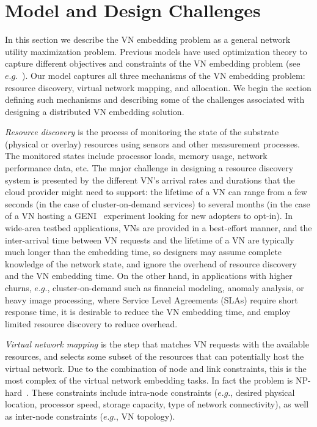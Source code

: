 \documentclass[a4paper, 10pt, conference]{ieeeconf}
\begin{document}
 




\vspace{-1mm}
\section{Model and Design Challenges}\label{sec:model}




In this section we describe the VN embedding problem as a general network utility maximization problem. Previous models have used optimization theory to capture different objectives and constraints of the VN embedding problem (see $e.g.$~\cite{ChowdhuryTON,Houidi2011}). Our model captures all three mechanisms of the VN embedding problem: resource discovery,  virtual network mapping,  and allocation.  We begin the section defining such mechanisms and describing some of the challenges associated with designing a distributed VN embedding solution.  

\emph{Resource discovery} is the process of monitoring the state of the substrate (physical or overlay) resources using sensors and other measurement processes. The monitored states include processor loads, memory usage, network performance data, etc. 
The major challenge in designing a resource discovery system is presented by the different VN's arrival rates and durations that the cloud provider might need to support: the lifetime of a VN can range from a few seconds (in the case of cluster-on-demand services) to several months (in the case of a VN hosting a GENI~\cite{GENI} experiment looking for new adopters to opt-in). 
In wide-area testbed applications, VNs are provided in a best-effort manner, and the inter-arrival time between VN requests and the lifetime of a VN are typically much longer than the embedding time, so designers may assume complete knowledge of the network state, and ignore the overhead of resource discovery and the VN embedding time. On the other hand, in applications with higher churns, $e.g.$, cluster-on-demand such as financial modeling, anomaly analysis, or heavy image processing, where Service Level Agreements (SLAs) require short response time, it is desirable to reduce the VN embedding time, and employ limited resource discovery to reduce overhead. 



{\it Virtual network mapping} is the step that matches VN requests with the available resources, and selects some subset of the resources that can potentially host the virtual network. 
Due to the combination of node and link constraints, this is the most complex of the virtual network embedding tasks. In fact the problem is NP-hard~\cite{mappingNPhard}. These constraints include intra-node constraints ($e.g.$, desired physical location, processor speed, storage capacity, type of network connectivity), as well as inter-node constraints ($e.g.$, VN topology).
\end{document}
